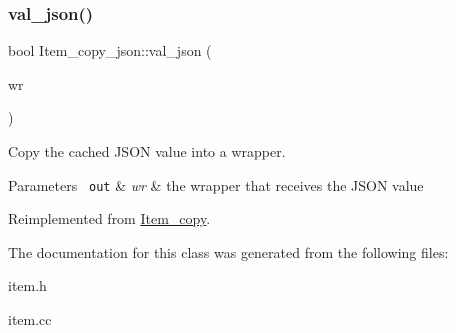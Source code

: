 \mbox{\label{classItem__copy__json_aead579100651419c06fe93f2e53bb396}} 
\subsubsection{\texorpdfstring{val\+\_\+json()}{val\_json()}}
{\footnotesize\ttfamily bool Item\+\_\+copy\+\_\+json\+::val\+\_\+json (\begin{DoxyParamCaption}\item[{\mbox{\hyperlink{classJson__wrapper}{Json\+\_\+wrapper}} $\ast$}]{wr }\end{DoxyParamCaption})\hspace{0.3cm}{\ttfamily [virtual]}}

Copy the cached J\+S\+ON value into a wrapper. 
\begin{DoxyParams}[1]{Parameters}
\mbox{\texttt{ out}}  & {\em wr} & the wrapper that receives the J\+S\+ON value \\
\hline
\end{DoxyParams}


Reimplemented from \mbox{\hyperlink{classItem__copy_ab74e3b8e79f623d7caabec195ab69a11}{Item\+\_\+copy}}.



The documentation for this class was generated from the following files\+:\begin{DoxyCompactItemize}
\item 
item.\+h\item 
item.\+cc\end{DoxyCompactItemize}
